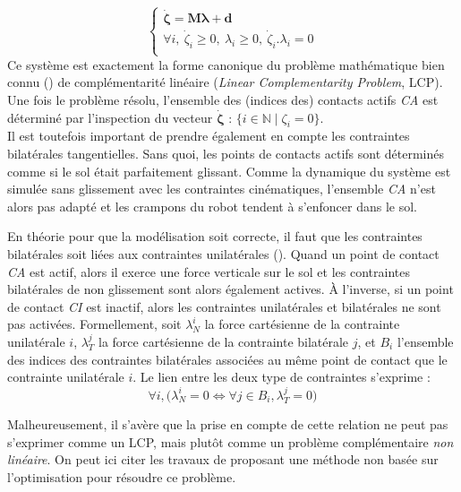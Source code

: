 $$
\begin{cases}
\dot{\bm{\zeta}} = \bm{M}\bm{\lambda} + \bm{d} \\
\forall i,~ \dot{\zeta}_{i} \geqslant 0,~ \lambda_{i} \geqslant 0,~ \dot{\zeta}_{i}.\lambda_{i} = 0 \\
\end{cases}
$$
Ce système est exactement la forme canonique du problème mathématique bien connu
(\cite{cottle_linear_2009}) de complémentarité linéaire 
(\textit{Linear Complementarity Problem}, LCP).
Une fois le problème résolu, l'ensemble des (indices des) contacts actifs 
\textit{CA} est déterminé par l'inspection du vecteur $\dot{\bm{\zeta}}$ : 
$\big\{ i \in \mathbb{N} \mid \zeta_{i} = 0\big\}$.\\

Il est toutefois important de prendre également en compte
les contraintes bilatérales tangentielles.
Sans quoi, les points de contacts actifs sont déterminés comme si
le sol était parfaitement glissant.
Comme la dynamique du système est simulée sans glissement 
avec les contraintes cinématiques, l'ensemble \textit{CA} n'est alors 
pas adapté et les crampons du robot tendent à s'enfoncer dans le sol.

En théorie pour que la modélisation soit correcte, il faut que les 
contraintes bilatérales soit \og liées \fg aux contraintes 
unilatérales (\cite{lynch_pulling_1995}).
Quand un point de contact \textit{CA} est actif, alors il exerce
une force verticale sur le sol et les contraintes bilatérales 
de non glissement sont alors également actives.
À l'inverse, si un point de contact \textit{CI} est inactif, alors
les contraintes unilatérales et bilatérales ne sont pas activées.
Formellement, soit $\lambda_{N}^{i}$ la force cartésienne 
de la contrainte unilatérale $i$, $\lambda_{T}^{j}$ la
force cartésienne de la contrainte bilatérale $j$, et $B_{i}$
l'ensemble des indices des contraintes bilatérales associées au même point
de contact que le contrainte unilatérale $i$.
Le lien entre les deux type de contraintes s'exprime :
$$
\forall i,
\big( 
\lambda_{N}^{i} = 0 
\Leftrightarrow 
\forall j \in B_{i}, \lambda_{T}^{j} = 0 
\big)
$$

Malheureusement, il s'avère que la prise en compte de cette relation
ne peut pas s'exprimer comme un LCP, mais plutôt comme un problème 
complémentaire \textit{non linéaire}.
On peut ici citer les travaux de \cite{baraff_fast_1994}
proposant une méthode non basée sur l'optimisation pour résoudre ce problème.

